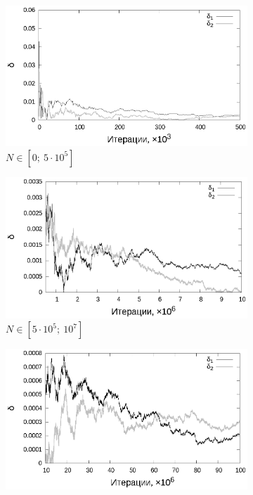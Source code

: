 \documentclass[11pt,a4paper]{article}
\theoremstyle{definition}
\begin{document}
\begin{figure}[h!]
  \begin{subfigure}[b]{0.3\textwidth}
    \includegraphics[width=\textwidth]{figs/classic/linear_log_1x_2_samples_50_variance_1_norm.log_0_500.eps}
    \caption{$N \in [0;~5 \cdot 10^5]$}
    \label{fig:classic_var1_n50_begin}
  \end{subfigure}
  \begin{subfigure}[b]{0.3\textwidth}
    \includegraphics[width=\textwidth]{figs/classic/linear_log_1x_2_samples_50_variance_1_norm.log_500_10000.eps}
    \caption{$N \in [5 \cdot 10^5;~10^7]$}
    \label{fig:classic_var1_n50_middle}
  \end{subfigure}
  \begin{subfigure}[b]{0.3\textwidth}
    \includegraphics[width=\textwidth]{figs/classic/linear_log_1x_2_samples_50_variance_1_norm.log_end.eps}

\end{subfigure}
\end{figure}
\end{document}
